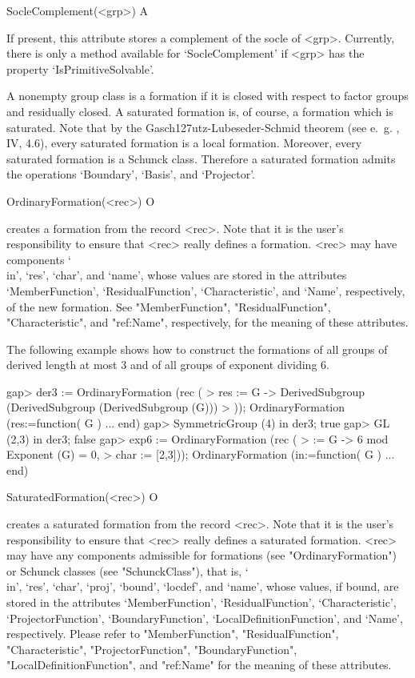 \>SocleComplement(<grp>) A

If present, this attribute stores a complement of the socle of <grp>.
Currently, there is only a method available for `SocleComplement'
if <grp> has the property `IsPrimitiveSolvable'.


\null


A nonempty group class is a  formation if it is closed with respect to factor
groups and residually closed. A saturated formation is, of course, a
formation which is saturated. Note that by the
Gasch\accent127utz-Lubeseder-Schmid theorem (see e.~g. \cite{DH92}, IV,
4.6), every saturated formation is a local formation. Moreover, every
saturated formation is a Schunck class. Therefore a saturated formation
admits the operations `Boundary', `Basis', and `Projector'.


\>OrdinaryFormation(<rec>) O

creates a formation from the record <rec>. Note that it is the user's responsibility to ensure that <rec> really
defines a formation. <rec> may have components `\\in',
`res', `char', and `name', whose values are stored in the attributes
`MemberFunction', `ResidualFunction', `Characteristic', and
`Name', respectively, of the new formation. See "MemberFunction", "ResidualFunction",
"Characteristic", and "ref:Name", respectively, for the meaning of these attributes.


The following example shows how to construct the formations of all groups of 
derived length at most $3$ and of all groups of exponent dividing $6$.

\beginexample
gap> der3 := OrdinaryFormation (rec (
>    res := G -> DerivedSubgroup (DerivedSubgroup (DerivedSubgroup (G)))
> ));
OrdinaryFormation (res:=function( G ) ... end)
gap> SymmetricGroup (4) in der3;
true
gap> GL (2,3) in der3;
false
gap> exp6 := OrdinaryFormation (rec (
>    \in := G -> 6 mod Exponent (G) = 0,
>    char := [2,3]));
OrdinaryFormation (in:=function( G ) ... end)
\endexample

\>SaturatedFormation(<rec>) O

creates a saturated formation from the record <rec>. Note that it is the user's
responsibility to ensure that <rec> really defines a saturated formation. <rec> may have
any components admissible for formations (see "OrdinaryFormation") or Schunck classes
(see "SchunckClass"), that is, `\\in', `res', `char', `proj', `bound', `locdef', and
`name',  whose values, if bound, are stored in the attributes `MemberFunction',
`ResidualFunction', `Characteristic',  `ProjectorFunction', `BoundaryFunction',
`LocalDefinitionFunction', and `Name', respectively.  Please refer to "MemberFunction", 
"ResidualFunction", "Characteristic",  "ProjectorFunction", "BoundaryFunction",
"LocalDefinitionFunction",  and "ref:Name" for the meaning of these attributes.

